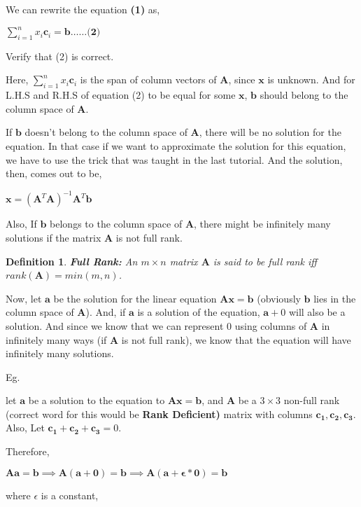 \documentclass[a4paper]{article}
\newtheorem{definition}[theorem]{Definition}
\begin{document}
We can rewrite the equation \textbf{(1)} as,

\begin{center}
    $
    \displaystyle\sum_{i=1}^{n}x_i\textbf{c}_i = \textbf{b} \dots\dots \textbf{(2)}
    $
\end{center}
Verify that (2) is correct.

Here, $\displaystyle\sum_{i=1}^{n}x_i\textbf{c}_i$ is the span of column vectors of $\textbf{A}$, since $\textbf{x}$ is unknown. And for L.H.S and R.H.S of equation (2) to be equal for some $\textbf{x}$, $\textbf{b}$ should belong to the column space of $\textbf{A}$.

If $\textbf{b}$ doesn't belong to the column space of $\textbf{A}$, there will be no solution for the equation. In that case if we want to approximate the solution for this equation, we have to use the trick that was taught in the last tutorial. And the solution, then, comes out to be,
\begin{center}
    $
    \textbf{x} = (\textbf{A}^T\textbf{A})^{-1}\textbf{A}^T\textbf{b}
    $
\end{center}

Also, If $\mathbf{b}$ belongs to the column space of $\textbf{A}$, there might be infinitely many solutions if the matrix $\textbf{A}$ is not full rank.

\begin{definition}
    \textbf{Full Rank: } An $m\times n$ matrix $\mathbf{A}$ is said to be full rank iff $rank(\mathbf{A}) = min(m,n)$.
\end{definition}

Now, let $\mathbf{a}$ be the solution for the linear equation $\mathbf{Ax} = \mathbf{b}$ (obviously $\mathbf{b}$ lies in the column space of $\mathbf{A}$). And, if $\mathbf{a}$ is a solution of the equation, $\mathbf{a} + 0$ will also be a solution. And since we know that we can represent $0$ using columns of $\mathbf{A}$ in infinitely many ways (if $\mathbf{A}$ is not full rank), we know that the equation will have infinitely many solutions.

Eg.

let $\mathbf{a}$ be a solution to the equation to $\mathbf{Ax} = \mathbf{b}$, and $\mathbf{A}$ be a $3 \times 3$ non-full rank (correct word for this would be \textbf{Rank Deficient)} matrix with columns $\mathbf{c_1}, \mathbf{c_2}, \mathbf{c_3}$. Also, Let $\mathbf{c_1} + \mathbf{c_2} + \mathbf{c_3} = 0$.

\newpage
Therefore,

\begin{center}
$
    \textbf{Aa} = \textbf{b} 
    
    \implies \mathbf{A(a+0)} = \mathbf{b}  
    
    \implies \mathbf{A(a+\epsilon*0)} = \mathbf{b} 
 $   
\end{center}
where $\epsilon$ is a constant,
\end{document}
